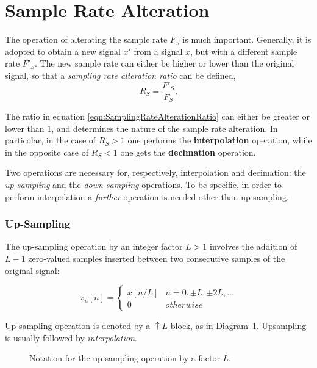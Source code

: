 \documentclass[\documentfontsize, twocolumn]{\classname}
\begin{document}
\section{Sample Rate Alteration}

The operation of alterating the sample rate $F_S$ is much important. Generally, it is adopted to obtain a new signal $x'$ from a signal $x$, but with a different sample rate $F'_S$. The new sample rate can either be high\-er or lower than the original signal, so that a \emph{sampling rate alteration ratio} can be defined,
\begin{equation}\label{eqn:SamplingRateAlterationRatio}
	R_S = \frac{F'_S}{F_S}.
\end{equation}

The ratio in equation \ref{eqn:SamplingRateAlterationRatio} can either be greater or lower than $1$, and determines the nature of the sample rate alteration. In particolar, in the case of $R_S > 1$ one performs the \textbf{interpolation} operation, while in the opposite case of $R_S < 1$ one gets the \textbf{decimation} operation. 

Two operations are necessary for, respectively, interpolation and decimation: the \emph{up-sampling} and the \emph{down-sam\-pling} operations. To be specific, in order to perform interpolation a \emph{further} operation is needed other than up-sampling.

\subsubsection{Up-Sampling}

The up-sampling operation by an integer factor $L > 1$ involves the addition of
$L-1$ zero-valued samples inserted between two consecutive samples of the
original signal:

\begin{equation}\label{eqn:UpSampling}
	x_u[n] =
	\left\{
		\begin{array}{ll}
			x[n/L] 	& n=0,\pm L, \pm 2L, \dots \\
			0 	& otherwise
		\end{array}
	\right.
\end{equation}

Up-sampling operation is denoted by a $\uparrow L$ block, as in Diagram~\ref{tikz:upsamplingOperation}. Upsampling is usually followed by \emph{interpolation}. 

\begin{figure}[ht]
\begin{center}
    \caption{Notation for the up-sampling operation by a factor $L$.}\label{tikz:upsamplingOperation}
\end{center}
\end{figure}
\end{document}
